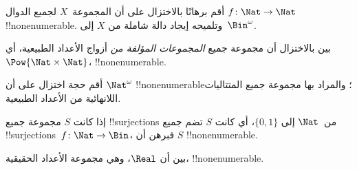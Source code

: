\documentclass[../../../include/open-logic-section]{subfiles}
\begin{document}
\begin{prob}\label{sfr:siz:red-alt:prob:nat-nat}
أقم برهانًا بالاختزال على أن المجموعة~$X$ لجميع الدوال $f\colon \Nat \to \Nat$ !!{nonenumerable}. وتلميحه إيجاد دالة شاملة من $X$ إلى~$\Bin^\omega$.
\end{prob}

\begin{prob}
بين بالاختزال أن مجموعة جميع \emph{المجموعات المؤلفة من} أزواج الأعداد الطبيعية، أي $\Pow{\Nat \times \Nat}$، !!{nonenumerable}.
\end{prob}

\begin{prob}
أقم حجة اختزال على أن $\Nat^\omega$ !!{nonenumerable}؛ والمراد بها مجموعة جميع المتتاليات اللانهائية من الأعداد الطبيعية.
\end{prob}


\begin{prob}
إذا كانت $S$ مجموعة جميع !!{surjection}s من~$\Nat$ إلى $\{0,1\}$، أي كانت $S$ تضم جميع !!{surjection}s~$f \colon \Nat
\to \Bin$، فبرهن أن $S$ !!{nonenumerable}.
\end{prob}

\begin{prob}
بين أن $\Real$، وهي مجموعة الأعداد الحقيقية، !!{nonenumerable}.
\end{prob}
\end{document}
